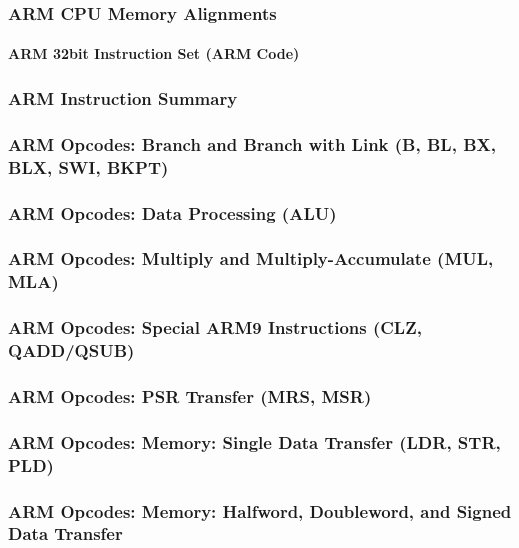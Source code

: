 \documentclass[11pt,a4paper]{proc}
\begin{document}
\begin{flushleft}
\subsubsection{ARM CPU Memory Alignments}

\paragraph{ARM 32bit Instruction Set (ARM Code)}

\subsubsection{ARM Instruction Summary}

\subsubsection{ARM Opcodes: Branch and Branch with Link (B, BL, BX, BLX, SWI, BKPT)}

\subsubsection{ARM Opcodes: Data Processing (ALU)}

\subsubsection{ARM Opcodes: Multiply and Multiply-Accumulate (MUL, MLA)}

\subsubsection{ARM Opcodes: Special ARM9 Instructions (CLZ, QADD/QSUB)}

\subsubsection{ARM Opcodes: PSR Transfer (MRS, MSR)}

\subsubsection{ARM Opcodes: Memory: Single Data Transfer (LDR, STR, PLD)}

\subsubsection{ARM Opcodes: Memory: Halfword, Doubleword, and Signed Data Transfer}


\end{flushleft}
\end{document}
